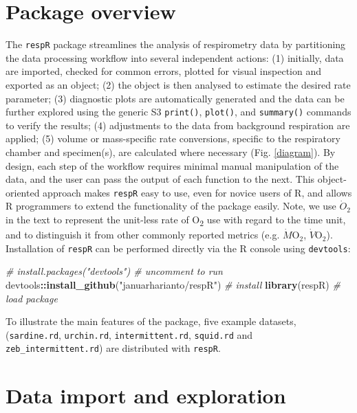 \documentclass[a4paper,10pt, oneside]{memoir}
\newenvironment{Shaded}{\begin{snugshade}}{\end{snugshade}}
\newcommand{\KeywordTok}[1]{\textcolor[rgb]{0.13,0.29,0.53}{\textbf{{#1}}}}
\newcommand{\StringTok}[1]{\textcolor[rgb]{0.31,0.60,0.02}{{#1}}}
\newcommand{\CommentTok}[1]{\textcolor[rgb]{0.56,0.35,0.01}{\textit{{#1}}}}
\newcommand{\OperatorTok}[1]{\textcolor[rgb]{0.81,0.36,0.00}{\textbf{{#1}}}}
\newcommand{\NormalTok}[1]{{#1}}
\begin{document}
\section{Package overview}\label{package-overview}

The \texttt{respR} package streamlines the analysis of respirometry data by partitioning the data processing workflow into several independent actions: (1) initially, data are imported, checked for common errors, plotted for visual inspection and exported as an object; (2) the object is then analysed to estimate the desired rate parameter; (3) diagnostic plots are automatically generated and the data can be further explored using the generic S3 \texttt{print()}, \texttt{plot()}, and \texttt{summary()} commands to verify the results; (4) adjustments to the data from background respiration are applied; (5) volume or mass-specific rate conversions, specific to the respiratory chamber and specimen(s), are calculated where necessary (Fig. \ref{diagram}).
By design, each step of the workflow requires minimal manual manipulation of the data, and the user can pass the output of each function to the next.
This object-oriented approach makes \texttt{respR} easy to use, even for novice users of R, and allows R programmers to extend the functionality of the package easily.
Note, we use \(\dot{O} \mathrm{_2}\) in the text to represent the unit-less rate of O\textsubscript{2} use with regard to the time unit, and to distinguish it from other commonly reported metrics (e.g. \(\dot{M}\mathrm{O_2}\), \(\dot{V}\mathrm{O_2}\)).
Installation of \texttt{respR} can be performed directly via the R console using \texttt{devtools}:

\begin{Shaded}
\begin{Highlighting}[]
\CommentTok{# install.packages("devtools") # uncomment to run}
\NormalTok{devtools}\OperatorTok{::}\KeywordTok{install_github}\NormalTok{(}\StringTok{"januarharianto/respR"}\NormalTok{) }\CommentTok{# install}
\KeywordTok{library}\NormalTok{(respR) }\CommentTok{# load package}
\end{Highlighting}
\end{Shaded}

To illustrate the main features of the package, five example datasets, (\texttt{sardine.rd}, \texttt{urchin.rd}, \texttt{intermittent.rd}, \texttt{squid.rd} and \texttt{zeb\_intermittent.rd}) are distributed with \texttt{respR}.

\section{Data import and exploration}\label{data-import-and-exploration}
\end{document}
